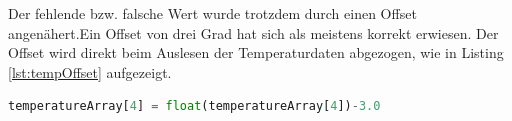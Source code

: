 Der fehlende bzw. falsche Wert wurde trotzdem durch einen Offset angenähert.Ein Offset von drei Grad hat sich als meistens korrekt erwiesen. Der Offset wird direkt beim Auslesen der Temperaturdaten abgezogen, wie in Listing \ref{lst:tempOffset} aufgezeigt.

\begin{lstlisting}[label=lst:tempOffset,caption=Offset des defekten Temperatusensors, language=Python, style=py]
temperatureArray[4] = float(temperatureArray[4])-3.0
\end{lstlisting}
